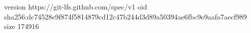 version https://git-lfs.github.com/spec/v1
oid sha256:dc74528e9f874f5814879cd12c47b244d3d89a50394ae6fbc9e9aafa7aecf989
size 174916
